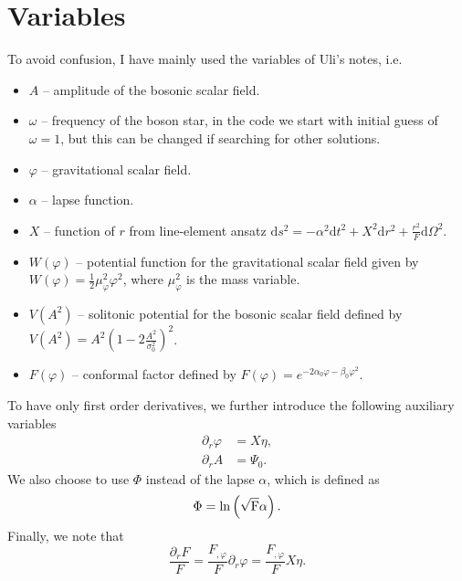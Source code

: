\documentclass[12pt]{article}
\newcommand{\du}{\mathrm{d}}
\numberwithin{equation}{section}
\begin{document}
\section{Variables}
To avoid confusion, I have mainly used the variables of Uli's notes, i.e.
\begin{itemize}
    \item $A$ -- amplitude of the bosonic scalar field.
    \item $\omega$ -- frequency of the boson star, in the code we start with initial guess of $\omega =1$, but this can be changed if searching for other solutions.
    \item $\varphi$ -- gravitational scalar field.
    \item $\alpha$ -- lapse function.
    \item $X$ -- function of $r$ from line-element ansatz $\du s^2 = -\alpha^2 \du t^2 + X^2 \du r^2 + \frac{r^2}{F} \du \Omega^2$.
    \item $W(\varphi)$ -- potential function for the gravitational scalar field given by $W(\varphi) = \frac{1}{2}\mu_{\varphi}^2 \varphi^2$, where $\mu_{\varphi}^2$ is the mass variable.
    \item $V(A^2)$ -- solitonic potential for the bosonic scalar field defined by $V(A^2) = A^2\left(1 - 2\frac{A^2}{\sigma_0^2}\right)^2$.
    \item $F(\varphi)$ -- conformal factor defined by $F(\varphi) = e^{-2\alpha_0 \varphi-\beta_0\varphi^2}$.
\end{itemize}
To have only first order derivatives, we further introduce the following auxiliary variables
\begin{align}
    \partial_r \varphi &= X \eta, \\
    \partial_r A &= \Psi_0.
\end{align}
We also choose to use $\Phi$ instead of the lapse $\alpha$, which is defined as
\begin{equation}
    \Phi = \rm{ln} \left(\sqrt{F} \alpha \right).
\end{equation}
Finally, we note that
\begin{equation}
    \frac{\partial_r F}{F} = \frac{F_{, \varphi}}{F}\partial_r \varphi = \frac{F_{, \varphi}}{F}X \eta.
\end{equation}


\end{document}

